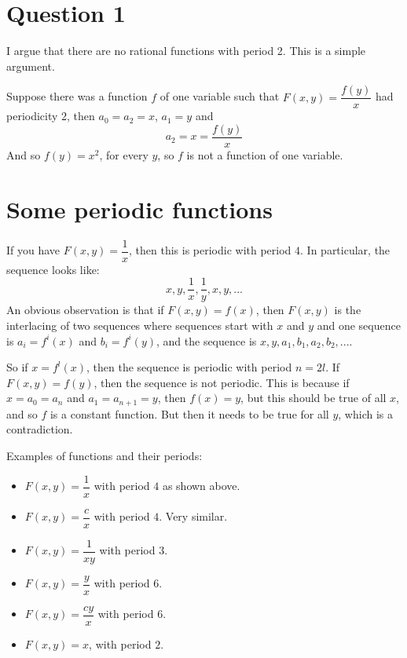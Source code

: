 \documentclass[12pt]{article}
\begin{document}
\maketitle

\section{Question 1}

I argue that there are no rational functions with period 2. This is a simple argument.

Suppose there was a function $f$ of one variable such that $F(x,y) = \dfrac{f(y)}{x}$ had periodicity 2, then $a_0 = a_2 = x$, $a_1 = y$ and
\[ a_2 = x = \dfrac{f(y)}{x} \]
And so $f(y) = x^2$, for every $y$, so $f$ is not a function of one variable. 

\section{Some periodic functions}

If you have $F(x,y) = \dfrac{1}{x}$, then this is periodic with period $4$. In particular, the sequence looks like:
\[ x, y, \dfrac{1}{x}, \dfrac{1}{y}, x, y, ... \]
An obvious observation is that if $F(x,y) = f(x)$, then $F(x,y)$ is the interlacing of two sequences where sequences start with $x$ and $y$ and one sequence is $a_i = f^{i}(x)$ and $b_i = f^{i}(y)$, and the sequence is $x,y,a_1, b_1, a_2, b_2, ...$.

So if $x = f^{l}(x)$, then the sequence is periodic with period $n = 2l$. If $F(x,y) = f(y)$, then the sequence is not periodic. This is because if $x = a_0 = a_n$ and $a_1 = a_{n+1} = y$, then $f(x) = y$, but this should be true of all $x$, and so $f$ is a constant function. But then it needs to be true for all $y$, which is a contradiction. 

Examples of functions and their periods:
\begin{itemize}
\item $F(x, y) = \dfrac{1}{x}$ with period $4$ as shown above.
\item $F(x,y) = \dfrac{c}{x}$ with period $4$. Very similar.
\item $F(x,y) = \dfrac{1}{xy}$ with period $3$.
\item $F(x,y) = \dfrac{y}{x}$ with period $6$.
\item $F(x,y) = \dfrac{cy}{x}$ with period $6$. 
\item $F(x,y) = x$, with period $2$. 
\end{itemize}
\end{document}
